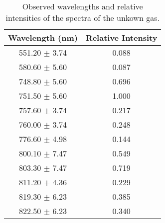 \begin{table}
    \begin{adjustbox}{width=0.5\textwidth, center}
        \begin{tabular}{|c|c|}
            \hline
            Wavelength (nm)   & Relative Intensity \\
            \hline
            551.20 $\pm$ 3.74 & 0.088              \\
            580.60 $\pm$ 5.60 & 0.087              \\
            748.80 $\pm$ 5.60 & 0.696              \\
            751.50 $\pm$ 5.60 & 1.000              \\
            757.60 $\pm$ 3.74 & 0.217              \\
            760.00 $\pm$ 3.74 & 0.248              \\
            776.60 $\pm$ 4.98 & 0.144              \\
            800.10 $\pm$ 7.47 & 0.549              \\
            803.30 $\pm$ 7.47 & 0.719              \\
            811.20 $\pm$ 4.36 & 0.229              \\
            819.30 $\pm$ 6.23 & 0.385              \\
            822.50 $\pm$ 6.23 & 0.340              \\
            \hline
        \end{tabular}
    \end{adjustbox}
    \caption{Observed wavelengths and relative intensities of the spectra of the unkown gas.}
\end{table}